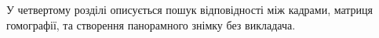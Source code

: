 У четвертому розділі описується пошук відповідності між кадрами,
матриця гомографії, та створення панорамного
знімку без викладача.